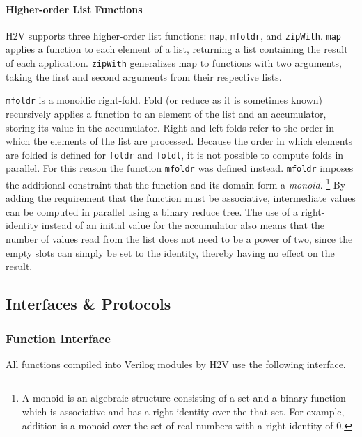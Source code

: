 \documentclass[english,onecolumn]{scrartcl}
\begin{document}
\paragraph{Higher-order List Functions}
\label{sec:listFuncs}
H2V supports three higher-order list functions: \texttt{map}, \texttt{mfoldr}, and \texttt{zipWith}.
\texttt{map} applies a function to each element of a list, returning a list containing the result of each application.
\texttt{zipWith} generalizes map to functions with two arguments, taking the first and second arguments from their respective
lists.

\texttt{mfoldr} is a monoidic right-fold. Fold (or reduce as it is sometimes known) recursively applies a function to an element
of the list and an accumulator, storing its value in the accumulator. Right and left folds refer to the order in which the
elements of the list are processed. Because the order in which elements are folded is defined for \texttt{foldr} and
\texttt{foldl}, it is not possible to compute folds in parallel. For this reason the function \texttt{mfoldr} was defined instead.
\texttt{mfoldr} imposes the additional constraint that the function and its domain form a \textit{monoid}.%
\footnote{A monoid is an algebraic structure consisting of a set and a binary function which is associative and has a
    right-identity over the that set. For example, addition is a monoid over the set of real numbers with a right-identity of 0.}
By adding the requirement that the function must be associative, intermediate values can be computed in parallel using a binary
reduce tree. The use of a right-identity instead of an initial value for the accumulator also means that the number of values read
from the list does not need to be a power of two, since the empty slots can simply be set to the identity, thereby having no
effect on the result.


\subsection{Interfaces \& Protocols}
\subsubsection{Function Interface}
All functions compiled into Verilog modules by H2V use the following interface.
\end{document}
